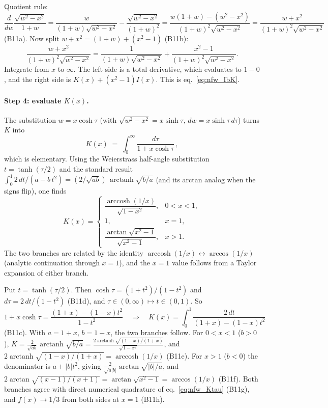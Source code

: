 \begin{derivation}
Quotient rule:
\[
  \frac{d}{dw}\frac{\sqrt{w^2-x^2}}{1+w}
  = \frac{w}{(1+w)\sqrt{w^2-x^2}}-\frac{\sqrt{w^2-x^2}}{(1+w)^2}
  = \frac{w(1+w)-(w^2-x^2)}{(1+w)^2\sqrt{w^2-x^2}}
  = \frac{w+x^2}{(1+w)^2\sqrt{w^2-x^2}}
\]
(B11a).  Now split $w+x^2 = (1+w)+(x^2-1)$ (B11b):
\[
  \frac{w+x^2}{(1+w)^2\sqrt{w^2-x^2}} = \frac{1}{(1+w)\sqrt{w^2-x^2}}
  + \frac{x^2-1}{(1+w)^2\sqrt{w^2-x^2}} .
\]
Integrate from $x$ to $\infty$.  The left side is a total derivative, which
evaluates to $1-0$, and the right side is $K(x)+(x^2-1)I(x)$.  This is
eq.~\eqref{eq:nfw_IbK}.
\end{derivation}

\paragraph{Step 4: evaluate $K(x)$.}
The substitution $w = x\cosh\tau$ (with $\sqrt{w^2-x^2} = x\sinh\tau$,
$dw = x\sinh\tau\,d\tau$) turns $K$ into
\begin{equation}
    K(x) \;=\; \int_0^{\infty} \frac{d\tau}{1 + x\cosh\tau} \,,
    \label{eq:nfw_Ktau}
\end{equation}
which is elementary.  Using the Weierstrass half-angle substitution
$t = \tanh(\tau/2)$ and the standard result
$\int_0^1\! 2\,dt/(a-b\,t^2)
= (2/\sqrt{ab})\,\operatorname{arctanh}\!\sqrt{b/a}$
(and its arctan analog when the signs flip), one finds
\begin{equation}
    \boxed{
    K(x) = \begin{cases}
        \dfrac{\operatorname{arccosh}(1/x)}{\sqrt{1-x^2}},
            & 0 < x < 1, \\[8pt]
        1, & x = 1, \\[4pt]
        \dfrac{\arctan\!\sqrt{x^2-1}}{\sqrt{x^2-1}},
            & x > 1.
    \end{cases}}
    \label{eq:nfw_K_branches}
\end{equation}
The two branches are related by the identity
$\operatorname{arccosh}(1/x) \leftrightarrow \arccos(1/x)$ (analytic
continuation through $x=1$), and the $x=1$ value follows from a
Taylor expansion of either branch.

\begin{derivation}
Put $t = \tanh(\tau/2)$.  Then $\cosh\tau = (1+t^2)/(1-t^2)$ and
$d\tau = 2\,dt/(1-t^2)$ (B11d), and $\tau\in(0,\infty)\mapsto t\in(0,1)$.  So
\[
  1+x\cosh\tau = \frac{(1+x)-(1-x)t^2}{1-t^2}
  \quad\Rightarrow\quad
  K(x) = \int_0^1\frac{2\,dt}{(1+x)-(1-x)t^2}
\]
(B11c).  With $a = 1+x$, $b = 1-x$, the two branches follow.  For
$0<x<1$ ($b>0$),
$K = \frac{2}{\sqrt{ab}}\operatorname{arctanh}\sqrt{b/a}
= \frac{2\operatorname{arctanh}\sqrt{(1-x)/(1+x)}}{\sqrt{1-x^2}}$, and
$2\operatorname{arctanh}\sqrt{(1-x)/(1+x)} = \operatorname{arccosh}(1/x)$ (B11e).
For $x>1$ ($b<0$) the denominator is $a+|b|t^2$, giving
$\frac{2}{\sqrt{a|b|}}\arctan\sqrt{|b|/a}$, and
$2\arctan\sqrt{(x-1)/(x+1)} = \arctan\sqrt{x^2-1} = \arccos(1/x)$ (B11f).
Both branches agree with direct numerical quadrature of
eq.~\eqref{eq:nfw_Ktau} (B11g), and $f(x)\to1/3$ from both sides at $x = 1$ (B11h).
\end{derivation}

